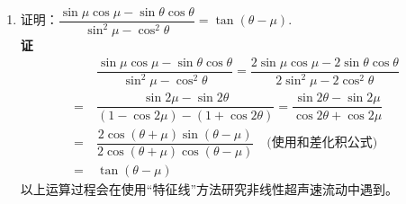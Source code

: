 \begin{enumerate}[label={【\textbf{例\thechapter.\arabic*}】},
 leftmargin=\inteval{\myenumleftmargin}pt,
 itemsep=\inteval{\myenumitempsep}pt,
 itemindent=\inteval{\myenumitemindent}pt]
\item 证明：$ \dfrac{\sin \mu\cos\mu-\sin\theta \cos\theta}
{\sin^2 \mu-\cos^2\theta}=\tan(\theta-\mu) $. \\
\textbf{证}\ 
\begin{align*}
    &\ \dfrac{\sin \mu\cos\mu-\sin\theta \cos\theta}
    {\sin^2 \mu-\cos^2\theta}
    = \dfrac{2\sin \mu\cos\mu-2\sin\theta \cos\theta}
    {2\sin^2 \mu-2\cos^2\theta}\\
    =&\ \dfrac{\sin2\mu-\sin2\theta}{(1-\cos2\mu)-(1+
        \cos2\theta)}
    = \dfrac{\sin2\theta-\sin2\mu}{\cos2\theta+
        \cos2\mu}\\
    =&\ \dfrac{2\cos(\theta+\mu)\sin(\theta-\mu)}{
        2\cos(\theta+\mu)\cos(\theta-\mu)}
    \quad \text{(使用和差化积公式)} \\
    =&\ \tan(\theta-\mu)
\end{align*}
以上运算过程会在使用“特征线”方法研究非线性超声速流动中遇到。


\end{enumerate}
